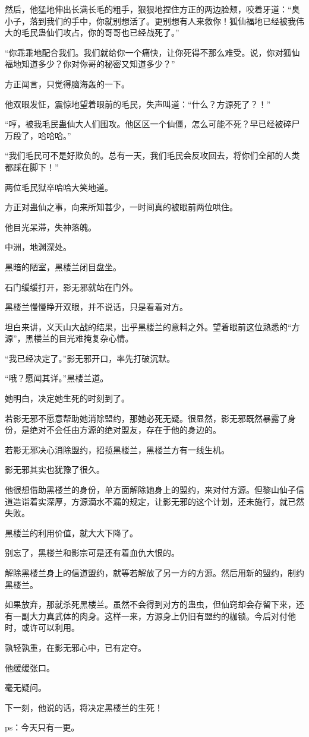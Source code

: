 \begin{this_body}
然后，他猛地伸出长满长毛的粗手，狠狠地捏住方正的两边脸颊，咬着牙道：“臭小子，落到我们的手中，你就别想活了。更别想有人来救你！狐仙福地已经被我伟大的毛民蛊仙们攻占，你的哥哥也已经战死了。”

“你乖乖地配合我们。我们就给你一个痛快，让你死得不那么难受。说，你对狐仙福地知道多少？你对你哥的秘密又知道多少？”

方正闻言，只觉得脑海轰的一下。

他双眼发怔，震惊地望着眼前的毛民，失声叫道：“什么？方源死了？！”

“哼，被我毛民蛊仙大人们围攻。他区区一个仙僵，怎么可能不死？早已经被碎尸万段了，哈哈哈。”

“我们毛民可不是好欺负的。总有一天，我们毛民会反攻回去，将你们全部的人类都踩在脚下！”

两位毛民狱卒哈哈大笑地道。

方正对蛊仙之事，向来所知甚少，一时间真的被眼前两位哄住。

他目光呆滞，失神落魄。

中洲，地渊深处。

黑暗的陋室，黑楼兰闭目盘坐。

石门缓缓打开，影无邪就站在门外。

黑楼兰慢慢睁开双眼，并不说话，只是看着对方。

坦白来讲，义天山大战的结果，出乎黑楼兰的意料之外。望着眼前这位熟悉的“方源”，黑楼兰的目光难掩复杂心情。

“我已经决定了。”影无邪开口，率先打破沉默。

“哦？愿闻其详。”黑楼兰道。

她明白，决定她生死的时刻到了。

若影无邪不愿意帮助她消除盟约，那她必死无疑。很显然，影无邪既然暴露了身份，是绝对不会任由方源的绝对盟友，存在于他的身边的。

若影无邪决心消除盟约，招揽黑楼兰，黑楼兰方有一线生机。

影无邪其实也犹豫了很久。

他很想借助黑楼兰的身份，单方面解除她身上的盟约，来对付方源。但黎山仙子信道造诣着实深厚，方源滴水不漏的规定，让影无邪的这个计划，还未施行，就已然失败。

黑楼兰的利用价值，就大大下降了。

别忘了，黑楼兰和影宗可是还有着血仇大恨的。

解除黑楼兰身上的信道盟约，就等若解放了另一方的方源。然后用新的盟约，制约黑楼兰。

如果放弃，那就杀死黑楼兰。虽然不会得到对方的蛊虫，但仙窍却会存留下来，还有一副大力真武体的肉身。这样一来，方源身上仍旧有盟约的枷锁。今后对付他时，或许可以利用。

孰轻孰重，在影无邪心中，已有定夺。

他缓缓张口。

毫无疑问。

下一刻，他说的话，将决定黑楼兰的生死！

ps：今天只有一更。

\end{this_body}

